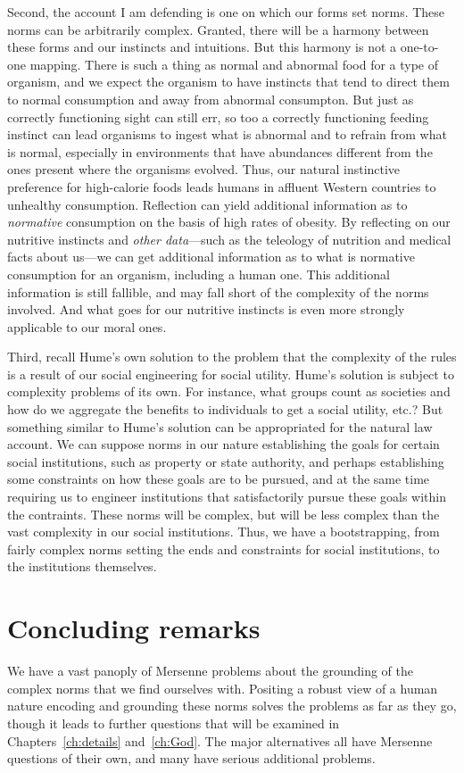 Second, the account I am defending is one on which our forms set norms. These norms can be arbitrarily complex.
Granted, there will be a harmony between these forms and our instincts and intuitions. But this harmony is not
a one-to-one mapping. There is such a thing as normal and abnormal food for a type of organism, and we expect the organism
to have instincts that tend to direct them to normal consumption and away from abnormal consumpton. But just as correctly
functioning sight can still err, so too a correctly functioning feeding instinct can lead organisms to ingest
what is abnormal and to refrain from what is normal, especially in environments that have abundances different from the
ones present where the organisms evolved. Thus, our natural instinctive
preference for high-calorie foods leads humans in affluent Western countries to unhealthy consumption.
Reflection can yield additional information as to \textit{normative} consumption on the basis of
high rates of obesity. By reflecting on our nutritive instincts and \textit{other data}---such as the teleology of
nutrition and medical facts about us---we can get additional information as to what is normative consumption for
an organism, including a human one. This additional information is still fallible, and may fall short of the complexity
of the norms involved. And what goes for our nutritive instincts is even more strongly applicable to our moral ones.

Third, recall Hume's own solution to the problem that the complexity of the rules is a result of our social engineering for social utility. 
Hume's solution is subject to complexity problems of its own. For
instance, what groups count as societies and how do we aggregate the benefits to individuals to get a social utility, etc.? 
But something similar to Hume's solution can be appropriated for the natural law account. We can suppose norms in our nature 
establishing the goals for certain social institutions, such as property or state authority, and perhaps establishing some 
constraints on how these goals are to be pursued, and at the same time requiring us to engineer institutions that satisfactorily
pursue these goals within the contraints. These norms will be complex, but will be less complex than the vast complexity in
our social institutions. Thus, we have a bootstrapping, from fairly complex norms setting the ends and constraints for social
institutions, to the institutions themselves.


\section{Concluding remarks}
We have a vast panoply of Mersenne problems about the grounding of the complex norms that we find ourselves with.
Positing a robust view of a human nature encoding and grounding these norms solves the problems as far as they
go, though it leads to further questions that will be examined in Chapters~\ref{ch:details} and~\ref{ch:God}. The major alternatives all
have Mersenne questions of their own, and many have serious additional problems.
\chaptertail 
